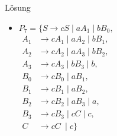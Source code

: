 {
\begin{frame}{Lösung}
        \begin{itemize}
            \item 
                \alert<1>{
                $P_7 = \{S \to cS \mid aA_1 \mid bB_0,$\\
                \vspace*{0.9mm}
                \hspace*{7mm}
                $\begin{aligned}
                A_1 &\to cA_1 \mid aA_2 \mid bB_1,\\
                A_2 &\to cA_2 \mid aA_3 \mid bB_2,\\
                A_3 &\to cA_3 \mid bB_3 \mid b,\\
                B_0 &\to cB_0 \mid aB_1,\\
                B_1 &\to cB_1 \mid aB_2,\\
                B_2 &\to cB_2 \mid aB_3 \mid a,\\
                B_3 &\to cB_3 \mid cC \mid c,\\
                C_{\;} &\to cC_{\;}\mid c\}
                \end{aligned}
                $}
        \end{itemize}
\end{frame}
}
